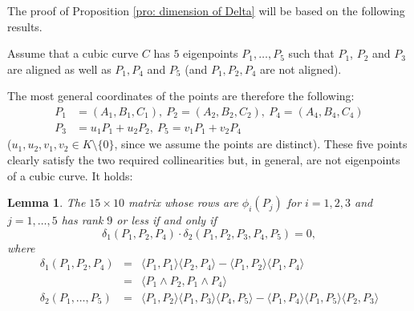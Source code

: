 \documentclass{amsart}
\theoremstyle{plain}
\newtheorem{lemma}[theorem]{Lemma}
\theoremstyle{definition}
\newcommand{\scl}[2]{\langle #1, #2 \rangle}
\begin{document}
The proof of Proposition \ref{pro: dimension of Delta} will be based on the following results.

Assume that a cubic curve $C$
has $5$ eigenpoints $P_1, \dots, P_5$ such that
$P_1$, $P_2$ and $P_3$ are aligned as well as
$P_1, P_4$ and $P_5$ (and $P_1, P_2, P_4$ are not aligned). 

The most general coordinates of the points are therefore the following:
\begin{equation}
  \label{5points}
  \begin{split}
P_1 &= (A_1, B_1, C_1), \ P_2 = (A_2, B_2, C_2), \  P_4 = (A_4, B_4, C_4)\\
P_3 &= u_1P_1+u_2P_2, \ P_5 = v_1P_1 +v_2P_4
\end{split}
\end{equation}
($u_1, u_2, v_1, v_2 \in K\setminus\{0\}$, since we assume the points
are distinct).
These five points clearly satisfy the two required collinearities 
but, in general, are not eigenpoints of a cubic curve.
It holds:
\begin{lemma}
  The $15 \times 10$ matrix whose rows are
  $\phi_i(P_j)$ for $i=1, 2, 3$ and $j = 1, \dots, 5$ has rank $9$ or less
  if and only if
  \[
  \delta_1(P_1, P_2, P_4)\cdot \delta_2(P_1, P_2, P_3, P_4, P_5) = 0,
  \]
  where
  \begin{eqnarray}
    \delta_1(P_1, P_2, P_4)  & = & \scl{P_1}{P_1}\scl{P_2}{P_4} -
    \scl{P_1}{P_2}\scl{P_1}{P_4} \label{delta1}\\
    & = &  \scl{P_1 \wedge P_2}{P_1 \wedge P_4} \nonumber \\
    \delta_2(P_1, \dots, P_5) & = &
         \scl{P_1}{P_2}\scl{P_1}{P_3}\scl{P_4}{P_5}-
    \scl{P_1}{P_4}\scl{P_1}{P_5}\scl{P_2}{P_3} \label{delta2}
  \end{eqnarray}
  \label{propFrc}
\end{lemma}
\end{document}
